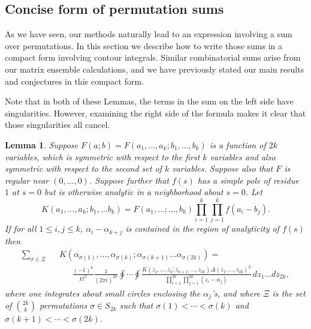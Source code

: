 \documentclass[12pt,letterpaper]{amsart}
\theoremstyle{plain}
\newtheorem{lemma}[theorem]{Lemma}
\theoremstyle{definition}
\theoremstyle{remark}
\numberwithin{equation}{subsection}
\numberwithin{theorem}{subsection}
\numberwithin{table}{subsection}
\begin{document}

\subsection{  Concise form of permutation sums
}\label{sec:concisesums}



As we have seen, our methods naturally lead to
an expression involving a sum over  permutations.
In this section we describe how to write those sums in a compact
form involving contour integrals.
Similar combinatorial sums arise from our matrix ensemble
calculations, and we have previously stated our main results
and conjectures in this compact form.

Note that in both of these Lemmas, the terms in the sum on the left
side have singularities.  However, examining the right side of the
formula makes it clear that those singularities all cancel.

\begin{lemma} \label{thm:concisesumunitary}
 Suppose
$F(a;b)=F(a_1,\dots,a_k;b_1,\dots,b_{k})$ is a function of $2k$
variables, which is symmetric with respect to the first $k$
variables and also symmetric with respect to the second set of $k$
variables. Suppose also that $F$ is regular near $(0,\dots,0)$.
Suppose further that $f(s)$ has a simple pole of residue~$1$ at
$s=0$ but is otherwise analytic in a neighborhood about $s=0$.
Let
\begin{equation}
K(a_1,\dots,a_k;b_1,\dots b_k)= F(a_1,\dots;\dots,b_k)
\prod_{i=1}^k\prod_{j=1}^k f(a_i-b_j).
\end{equation}
If for all $1\leq i,j \leq k$, $\alpha_i-\alpha_{k+j}$ is
contained in the region of analyticity of $f(s)$ then
\begin{eqnarray}
 \sum_{\sigma \in \Xi}&   &K( \alpha_{\sigma(1)},\dots,  \alpha_{\sigma(k)};
    \alpha_{\sigma(k+1)}\dots  \alpha_{\sigma(2k)})=\nonumber \\&   &\ \ \ \ \ \ \
 \frac{(-1)^k}{k!^2}\frac{1}{(2\pi i)^{2k}}
\oint \cdots \oint \frac{K(z_1, \dots,z_k;z_{k+1},\dots,z_{2k})
\Delta(z_1,\dots,z_{2k})^2}{\prod_{i=1}^{2k}\prod_{j=1}^{2k}
(z_i-\alpha_j)} \,dz_1\dots dz_{2k},
\end{eqnarray}
where one integrates about small circles enclosing the
$\alpha_j$'s, and where $\Xi$ is the set of $\binom{2k}{k}$
permutations $\sigma\in S_{2k}$ such that $\sigma(1)<\cdots <
\sigma(k)$ and $\sigma(k+1)<\cdots < \sigma(2k)$.
\end{lemma}
\end{document}
